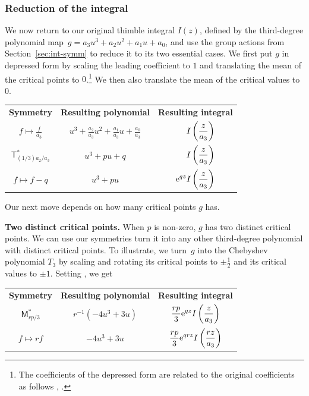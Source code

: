 \documentclass[10pt,a4paper]{amsart}
\numberwithin{equation}{section}
\begin{document}
\subsubsection{Reduction of the integral}
We now return to our original thimble integral $I(z)$, defined by the third-degree polynomial map~${ g = a_3 u^3 + a_2 u^2 + a_1 u + a_0}$,
and use the group actions from Section~\ref{sec:int-symm} to reduce it to its two essential cases. We first put $g$ in depressed form by scaling the leading coefficient to $1$ and translating the mean of the critical points to $0$.\footnote{The coefficients of the depressed form are related to the original coefficients as follows
, .
} We then also translate the mean of the critical values to $0$.
\begin{center}
\begin{tabular}{c|c|c}
\textbf{Symmetry} & \textbf{Resulting polynomial} & \textbf{Resulting integral} \\[2mm]
$\displaystyle f \mapsto \frac{f}{a_3}$ & $\displaystyle u^3 + \frac{a_2}{a_3} u^2 + \frac{a_1}{a_3} u + \frac{a_0}{a_3}$ & $\displaystyle \hphantom{{\rm e}^{qz}} I\left(\frac{z}{a_3}\right)$ \\[5mm]
$\displaystyle \mathsf{T}_{(1/3) a_2/a_3}^*$ & $\displaystyle u^3 + pu + q$ & $\displaystyle \hphantom{{\rm e}^{qz}} I\left(\frac{z}{a_3}\right)$ \\[5mm]
$\displaystyle f \mapsto f - q$ & $\displaystyle u^3 + pu$ & $\displaystyle {\rm e}^{qz} I\left(\frac{z}{a_3}\right)$ \\[5mm]
\end{tabular}
\end{center}
Our next move depends on how many critical points $g$ has.

 \textbf{Two distinct critical points.}
When $p$ is non-zero, $g$ has two distinct critical points. We can use our symmetries turn it into any other third-degree polynomial with distinct critical points. To illustrate, we turn~$g$ into the Chebyshev polynomial $T_3$ by scaling and rotating its critical points to $\pm\frac{1}{2}$ and its critical values to $\pm 1$. Setting
,
we get
\begin{center}
\begin{tabular}{c|c|c}
\textbf{Symmetry} & \textbf{Resulting polynomial} & \textbf{Resulting integral} \\[2mm]
$\displaystyle \mathsf{M}_{rp/3}^*$ & $\displaystyle r^{-1} \left(-4u^3 + 3u\right)$ & $\displaystyle \frac{rp}{3} {\rm e}^{qz} I\left(\frac{z}{a_3}\right)$ \\[5mm]
$\displaystyle f \mapsto rf$ & $\displaystyle -4u^3 + 3u$ & $\displaystyle \frac{rp}{3} {\rm e}^{qrz} I\left(\frac{rz}{a_3}\right)$ \\[5mm]
\end{tabular}
\end{center}
\end{document}
